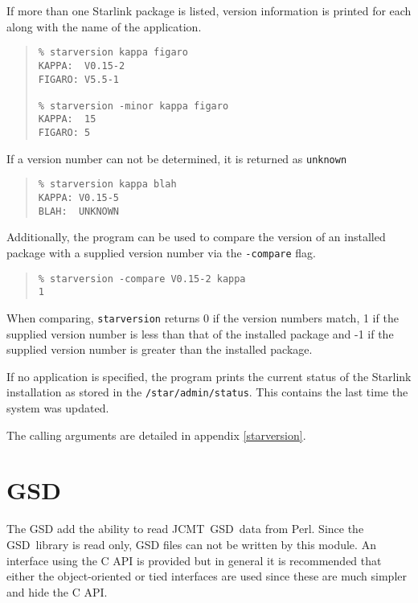 \documentclass[twoside,11pt]{article}
\newenvironment{myquote}{\begin{quote}\begin{small}}{\end{small}\end{quote}}
\newcommand{\gsd}{\xref{{GSD}}{sun229}{}}
\newcommand{\perl}{\xref{\textsf{Perl}}{sun193}{}}
\newcommand{\jcmt}{\htmladdnormallink{JCMT}{http://www.jach.hawaii.edu/JACpublic/JCMT}}
\newcommand{\htmladdnormallink}[2]{#1}
\newcommand{\xref}[3]{#1}
\renewcommand{\_}{\texttt{\symbol{95}}}
\begin{document}
If more than one Starlink package is listed, version information
is printed for each along with the name of the application.

\begin{myquote}
\begin{verbatim}
% starversion kappa figaro
KAPPA:  V0.15-2
FIGARO: V5.5-1

% starversion -minor kappa figaro
KAPPA:  15
FIGARO: 5
\end{verbatim}
\end{myquote}


If a version number can not be determined, it is returned as \texttt{unknown}

\begin{myquote}
\begin{verbatim}
% starversion kappa blah
KAPPA: V0.15-5
BLAH:  UNKNOWN
\end{verbatim}
\end{myquote}

Additionally, the program can be used to compare the version of
an installed package with a supplied version number via the
\texttt{-compare} flag.

\begin{myquote}
\begin{verbatim}
% starversion -compare V0.15-2 kappa
1
\end{verbatim}
\end{myquote}

When comparing, \texttt{starversion} returns 0 if the version numbers match,
1 if the supplied version number is less than that of the installed
package and -1 if the supplied version number is greater than the
installed package.



If no application is specified, the program prints the current status
of the Starlink installation as stored in the \texttt{/star/admin/status}.
This contains the last time the system was updated.



The calling arguments are detailed in appendix \ref{starversion}.

\section{GSD}

The GSD add the ability to read \jcmt\ \gsd\ data from \perl. Since the
\gsd\ library is read only, GSD files can not be written by this module.
An interface using the C API is provided but in general it is recommended
that either the object-oriented or tied interfaces are used since these
are much simpler and hide the C API.
\end{document}
